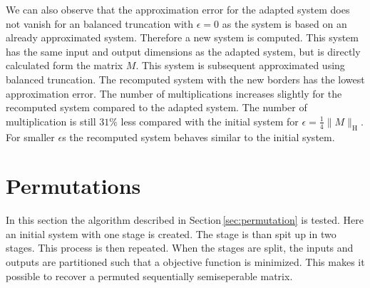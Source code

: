 \documentclass[doctype=mastersthesis,BCOR=15mm,biblatex]{ldvbook}%
\begin{document}
We can also observe that the approximation error for the adapted system does not vanish for an balanced truncation with $\epsilon = 0$ as the system is based on an already approximated system.
Therefore a new system is computed. 
This system has the same input and output dimensions as the adapted system, but is directly calculated form the matrix $M$.
This system is subsequent approximated using balanced truncation.
The recomputed system with the new borders has the lowest approximation error.
The number of multiplications increases slightly for the recomputed system compared to the adapted system.
The number of multiplication is still $31\%$ less compared with the initial system for $\epsilon = \frac{1}{4}\|M\|_\text{H}$.
For smaller $\epsilon$s  the recomputed system behaves similar to the initial system.



\section{Permutations}\label{sec:test_perm}
In this section the algorithm described in Section\,\ref{sec:permutation} is tested.
Here an initial system with one stage is created.
The stage is than spit up in two stages.
This process is then repeated.
When the stages are split, the inputs and outputs are partitioned such that a objective function is minimized.
This makes it possible to recover a permuted sequentially semiseperable matrix.
\end{document}
